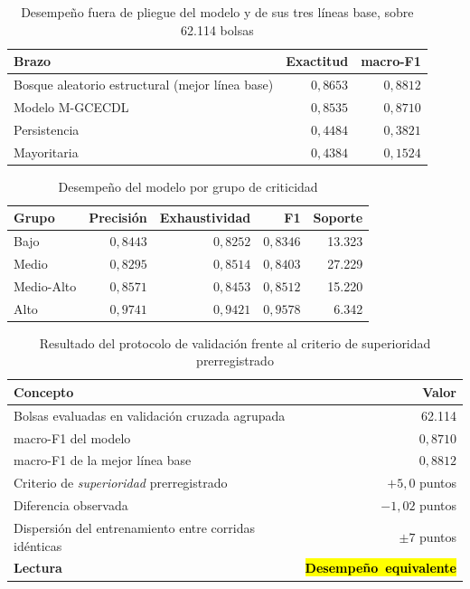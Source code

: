 \documentclass[11pt,a4paper]{article}
\newcommand{\nv}[1]{\hl{#1}}
\begin{document}
\begin{table}[H]
\centering
\caption{Desempeño fuera de pliegue del modelo y de sus tres líneas base, sobre 62.114 bolsas}
\label{tab:brazos}
\small
\begin{tabularx}{\textwidth}{X r r}
\toprule
\textbf{Brazo} & \textbf{Exactitud} & \textbf{macro-F1} \\
\midrule
Bosque aleatorio estructural (mejor línea base) & $0{,}8653$ & $0{,}8812$ \\
Modelo M-GCECDL & $0{,}8535$ & $0{,}8710$ \\
Persistencia & $0{,}4484$ & $0{,}3821$ \\
Mayoritaria & $0{,}4384$ & $0{,}1524$ \\
\bottomrule
\end{tabularx}
\end{table}

\begin{table}[H]
\centering
\caption{Desempeño del modelo por grupo de criticidad}
\label{tab:porclase}
\small
\begin{tabularx}{\textwidth}{X r r r r}
\toprule
\textbf{Grupo} & \textbf{Precisión} & \textbf{Exhaustividad} & \textbf{F1} & \textbf{Soporte} \\
\midrule
Bajo       & $0{,}8443$ & $0{,}8252$ & $0{,}8346$ & 13.323 \\
Medio      & $0{,}8295$ & $0{,}8514$ & $0{,}8403$ & 27.229 \\
Medio-Alto & $0{,}8571$ & $0{,}8453$ & $0{,}8512$ & 15.220 \\
Alto       & $0{,}9741$ & $0{,}9421$ & $0{,}9578$ & \phantom{0}6.342 \\
\bottomrule
\end{tabularx}
\end{table}

\begin{table}[H]
\centering
\caption{Resultado del protocolo de validación frente al criterio de superioridad prerregistrado}
\label{tab:validacion}
\small
\begin{tabularx}{\textwidth}{X r}
\toprule
\textbf{Concepto} & \textbf{Valor} \\
\midrule
Bolsas evaluadas en validación cruzada agrupada & 62.114 \\
macro-F1 del modelo & $0{,}8710$ \\
macro-F1 de la mejor línea base & $0{,}8812$ \\
Criterio de \emph{superioridad} prerregistrado & $+5{,}0$ puntos \\
Diferencia observada & $-1{,}02$ puntos \\
Dispersión del entrenamiento entre corridas idénticas & $\pm 7$ puntos \\
\textbf{Lectura} & \nv{\textbf{\mbox{Desempeño equivalente}}} \\
\bottomrule
\end{tabularx}
\end{table}
\end{document}
